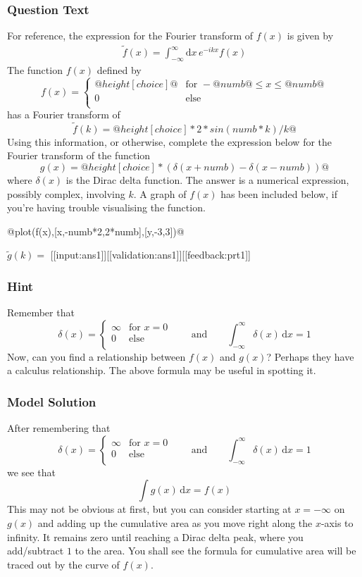 \documentclass[a4paper,10pt]{article}
\begin{document}
\subsubsection{Question Text}
For reference, the expression for the Fourier transform of $f(x)$ is given by \begin{align*}
\tilde{f}(x) = \int_{-\infty}^{\infty} \text{d}x \, e^{-ikx}f(x)
\end{align*}The function \(f(x)\) defined by \[ f(x) = \begin{cases} @height[choice]@ & \text{for } -@numb@ \leq x \leq @numb@\\ 0 & \text{else} \\ \end{cases} \] has a Fourier transform of \[ \tilde{f}(k) = @height[choice]*2*sin(numb*k)/k@ \] Using this information, or otherwise, complete the expression below for the Fourier transform of the function \[ g(x) = @height[choice]*(\delta(x+numb)-\delta(x-numb))@ \] where \(\delta(x)\) is the Dirac delta function. The answer is a numerical expression, possibly complex, involving \(k\). A graph of \(f(x)\) has been included below, if you're having trouble visualising the function.

@plot(f(x),[x,-numb*2,2*numb],[y,-3,3])@

\(\tilde{g}(k) = \) [[input:ans1]][[validation:ans1]][[feedback:prt1]]
\subsubsection{Hint}
Remember that \[\delta(x) = \begin{cases} \infty & \text{for } x=0\\ 0 & \text{else} \\ \end{cases} \qquad \text{and} \qquad \int_{-\infty}^{\infty} \delta(x) \, \text{d}x = 1\] Now, can you find a relationship between \(f(x)\) and \(g(x)\)? Perhaps they have a calculus relationship. The above formula may be useful in spotting it.
\subsubsection{Model Solution}
After remembering that \[\delta(x) = \begin{cases} \infty & \text{for } x=0\\ 0 & \text{else} \\ \end{cases} \qquad \text{and} \qquad \int_{-\infty}^{\infty} \delta(x) \, \text{d}x = 1\] we see that \[ \int g(x) \, \text{d}x = f(x) \] This may not be obvious at first, but you can consider starting at \(x=-\infty\) on \(g(x)\) and adding up the cumulative area as you move right along the \(x\)-axis to infinity. It remains zero until reaching a Dirac delta peak, where you add/subtract \(1\) to the area. You shall see the formula for cumulative area will be traced out by the curve of \(f(x)\).
\end{document}
